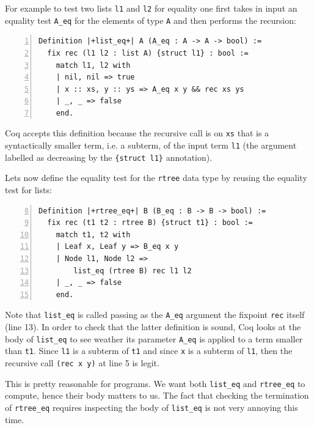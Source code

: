 \documentclass[sigplan,10pt,review]{acmart}\settopmatter{printfolios=true,printccs=false,printacmref=false}
\begin{document}
For example to test two lists \lstinline+l1+ and \lstinline+l2+ for
equality one first takes in input an equality test \lstinline+A_eq+
for the elements of type \lstinline+A+ and then performs the
recursion:

\begin{minipage}{\textwidth}\begin{lstlisting}[numbers=left]
Definition |+list_eq+| A (A_eq : A -> A -> bool) :=
  fix rec (l1 l2 : list A) {struct l1} : bool :=
    match l1, l2 with
    | nil, nil => true
    | x :: xs, y :: ys => A_eq x y && rec xs ys
    | _, _ => false
    end.
\end{lstlisting}\end{minipage}

\noindent
Coq accepts this definition because
the recursive call is on \lstinline+xs+ that is a syntactically
smaller term, i.e. a subterm, of the input term \lstinline+l1+ (the
argument labelled as decreasing by the \lstinline+{struct l1}+
annotation).

Lets now define the equality test for the \lstinline+rtree+ data type
by reusing the equality test for lists:

\begin{minipage}{\textwidth}\begin{lstlisting}[numbers=left,firstnumber=8]
Definition |+rtree_eq+| B (B_eq : B -> B -> bool) :=
  fix rec (t1 t2 : rtree B) {struct t1} : bool :=
    match t1, t2 with
    | Leaf x, Leaf y => B_eq x y
    | Node l1, Node l2 =>
        list_eq (rtree B) rec l1 l2
    | _, _ => false
    end.
\end{lstlisting}\end{minipage}

\noindent
Note that \lstinline+list_eq+ is called passing as the \lstinline+A_eq+
argument the fixpoint \lstinline+rec+ itself (line 13). In order to
check that the latter definition is sound, Coq looks at the body of
\lstinline+list_eq+ to see weather its parameter \lstinline+A_eq+ is
applied to a term smaller than \lstinline+t1+. Since
\lstinline+l1+ is a subterm of \lstinline+t1+ and since \lstinline+x+
is a subterm of \lstinline+l1+, then the recursive call
\lstinline+(rec x y)+ at line 5 is legit.

This is pretty reasonable for programs. We want both \lstinline+list_eq+
and \lstinline+rtree_eq+ to compute, hence their body matters to us.
The fact that checking the termination of \lstinline+rtree_eq+ requires
inspecting the body of \lstinline+list_eq+ is not very annoying this
time.
\end{document}
